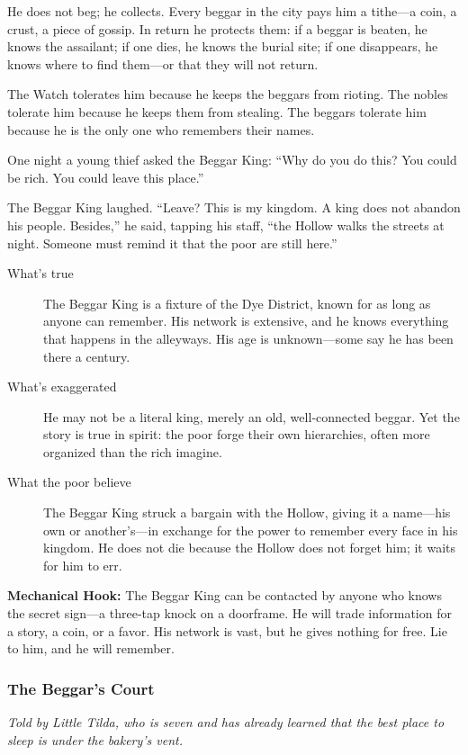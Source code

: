 \documentclass[11pt]{article}
\begin{document}
He does not beg; he collects. Every beggar in the city pays him a tithe—a coin, a crust, a piece of gossip. In return he protects them: if a beggar is beaten, he knows the assailant; if one dies, he knows the burial site; if one disappears, he knows where to find them—or that they will not return.

The Watch tolerates him because he keeps the beggars from rioting. The nobles tolerate him because he keeps them from stealing. The beggars tolerate him because he is the only one who remembers their names.

One night a young thief asked the Beggar King: “Why do you do this? You could be rich. You could leave this place.”

The Beggar King laughed. “Leave? This is my kingdom. A king does not abandon his people. Besides,” he said, tapping his staff, “the Hollow walks the streets at night. Someone must remind it that the poor are still here.”

\begin{description}
\item[What's true] The Beggar King is a fixture of the Dye District, known for as long as anyone can remember. His network is extensive, and he knows everything that happens in the alleyways. His age is unknown—some say he has been there a century.
\item[What's exaggerated] He may not be a literal king, merely an old, well‑connected beggar. Yet the story is true in spirit: the poor forge their own hierarchies, often more organized than the rich imagine.
\item[What the poor believe] The Beggar King struck a bargain with the Hollow, giving it a name—his own or another’s—in exchange for the power to remember every face in his kingdom. He does not die because the Hollow does not forget him; it waits for him to err.
\end{description}

\textbf{Mechanical Hook:} The Beggar King can be contacted by anyone who knows the secret sign—a three‑tap knock on a doorframe. He will trade information for a story, a coin, or a favor. His network is vast, but he gives nothing for free. Lie to him, and he will remember.

\subsubsection{The Beggar's Court}
\textit{Told by Little Tilda, who is seven and has already learned that the best place to sleep is under the bakery's vent.}
\end{document}
